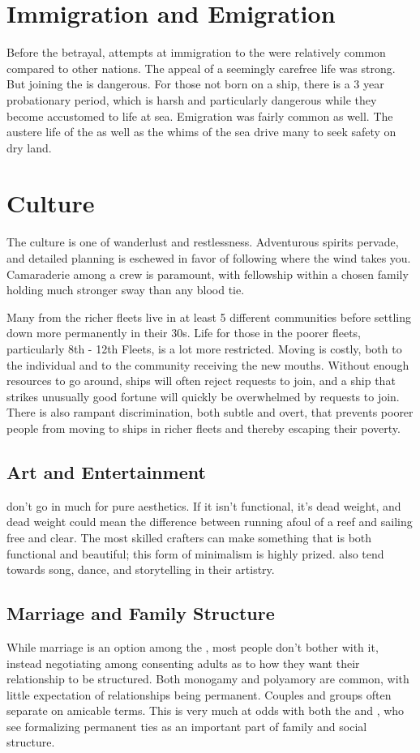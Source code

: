 \documentclass[blue]{GL2020}
\begin{document}
\section*{Immigration and Emigration}
Before the betrayal, attempts at immigration to the \pShip{} were relatively common compared to other nations. The appeal of a seemingly carefree life was strong. But joining the \pShippies{} is dangerous. For those not born on a ship, there is a 3 year probationary period, which is harsh and particularly dangerous while they become accustomed to life at sea. Emigration was fairly common as well. The austere life of the \pShip{} as well as the whims of the sea drive many to seek safety on dry land.

\section*{Culture}
The \pShip{} culture is one of wanderlust and restlessness. Adventurous spirits pervade, and detailed planning is eschewed in favor of following where the wind takes you. Camaraderie among a crew is paramount, with fellowship within a chosen family holding much stronger sway than any blood tie.

Many \pShippies{} from the richer fleets live in at least 5 different communities before settling down more permanently in their 30s. Life for those in the poorer fleets, particularly 8th - 12th Fleets, is a lot more restricted. Moving is costly, both to the individual and to the community receiving the new mouths. Without enough resources to go around, ships will often reject requests to join, and a ship that strikes unusually good fortune will quickly be overwhelmed by requests to join. There is also rampant discrimination, both subtle and overt, that prevents poorer people from moving to ships in richer fleets and thereby escaping their poverty.

\subsection*{Art and Entertainment}
\pShippies{} don't go in much for pure aesthetics. If it isn't functional, it's dead weight, and dead weight could mean the difference between running afoul of a reef and sailing free and clear. The most skilled crafters can make something that is both functional and beautiful; this form of minimalism is highly prized. \pShippies{} also tend towards song, dance, and storytelling in their artistry.

\subsection*{Marriage and Family Structure}
While marriage is an option among the \pShippies{}, most people don't bother with it, instead negotiating among consenting adults as to how they want their relationship to be structured. Both monogamy and polyamory are common, with little expectation of relationships being permanent. Couples and groups often separate on amicable terms. This is very much at odds with both the \pTech{} and \pFarm{}, who see formalizing permanent ties as an important part of family and social structure.
\end{document}
